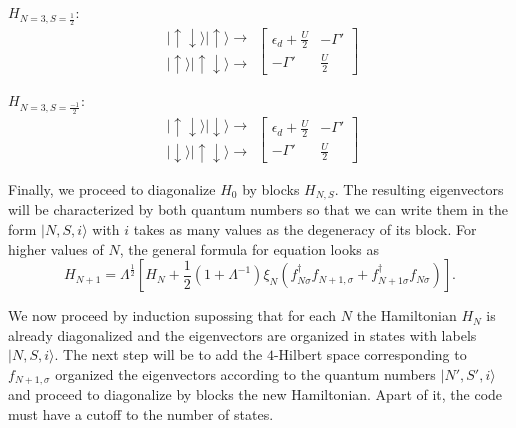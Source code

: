 \begin{multicols}{2}

$H_{N=3,S=\frac{1}{2}}:$
\[
\begin{array}{c}
\vert\uparrow\!\downarrow\rangle\vert\uparrow\rangle\rightarrow\\
\vert\uparrow\rangle\vert\uparrow\!\downarrow\rangle\rightarrow
\end{array}\left[\begin{array}{cc}
\epsilon_{d}+\frac{U}{2} & -\Gamma'\\
-\Gamma' & \frac{U}{2}
\end{array}\right]
\]


$H_{N=3,S=\frac{-1}{2}}:$
\[
\begin{array}{c}
\vert\uparrow\!\downarrow\rangle\vert\downarrow\rangle\rightarrow\\
\vert\downarrow\rangle\vert\uparrow\!\downarrow\rangle\rightarrow
\end{array}\left[\begin{array}{cc}
\epsilon_{d}+\frac{U}{2} & -\Gamma'\\
-\Gamma' & \frac{U}{2}
\end{array}\right]
\]


\end{multicols}

Finally, we proceed to diagonalize $H_{0}$ by blocks $H_{N,S}$.
The resulting eigenvectors will be characterized by both quantum numbers
so that we can write them in the form $\vert N,S,i\rangle$ with $i$
takes as many values as the degeneracy of its block. For higher values of $N$,
the general formula for equation  looks as 
\begin{equation}
H_{N+1}=\Lambda^{\frac{1}{2}}\left[H_{N}+\frac{1}{2}\left(1+\Lambda^{-1}\right)\xi_{N}\left(f_{N\sigma}^{\dagger}f_{N+1,\sigma}+f_{N+1\sigma}^{\dagger}f_{N\sigma}\right)\right].\label{eq:NRG-Iteration Hamiltonians}
\end{equation}


We now proceed by induction supossing that for each $N$ the Hamiltonian $H_{N}$ is already
diagonalized and the eigenvectors are organized in states with labels
$\vert N,S,i\rangle.$ The next step will be to add the $4$-Hilbert
space corresponding to $f_{N+1,\sigma}$ organized the eigenvectors
according to the quantum numbers $\vert N',S',i\rangle$ and proceed
to diagonalize by blocks the new Hamiltonian. Apart of it, the code
must have a cutoff to the number of states. \\

